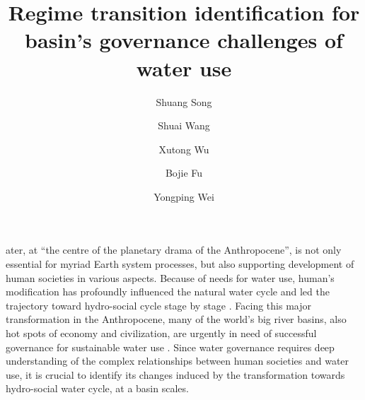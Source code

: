 \documentclass[9pt, twocolumn, twoside, lineno]{pnas-new}
\title{Regime transition identification for basin's governance challenges of water use}
\author[a, b]{Shuang Song}  %
\author[a, b, 1]{Shuai Wang}  %
\author[c, d]{Xutong Wu}  %
\author[a, b]{Bojie Fu}  %
\author[e]{Yongping Wei} %
\affil[a]{ %
	State Key Laboratory of Earth Surface Processes and Resource Ecology, 
	Faculty of Geographical Science, 
	Beijing Normal University, 
	Beijing 100875, 
	P.R. China
}
\affil[b]{ %
	Institute of Land Surface System and Sustainability, 
	Faculty of Geographical Science, 
	Beijing Normal University, 
	Beijing 100875, 
	P.R. China
}
\affil[c]{ %
	College of Urban and Environmental Sciences, 
	Peking University, 
	Beijing 100871, 
	P.R. China
}
\affil[d]{ %
	State Key Laboratory of Urban and Regional Ecology, 
	Research Center for Eco-Environmental Sciences, 
	Chinese Academy of Sciences, 
	Beijing 100085, 
	P.R. China 
}
\affil[e]{ %
	School of Earth and Environmental Sciences, 
	The University of Queensland, 
	Brisbane 4067, 
	Australia
}
\begin{document}
\maketitle
\thispagestyle{firststyle}

\label{introduction-section-1}
ater, at “the centre of the planetary drama of the Anthropocene”, is not only essential for myriad Earth system processes, but also supporting development of human societies in various aspects. 
Because of needs for water use, human's modification has profoundly influenced the natural water cycle and led the trajectory toward hydro-social cycle stage by stage
\cite{gleesonIlluminatingWaterCycle2020,cummingLinkingEconomicGrowth2018}.
Facing this major transformation in the Anthropocene, many of the world's big river basins, also hot spots of economy and civilization, are urgently in need of successful governance for sustainable water use
\cite{bestAnthropogenicStressesWorld2019}. 
Since water governance requires deep understanding of the complex relationships between human societies and water use, it is crucial to identify its changes induced by the transformation towards hydro-social water cycle, at a basin scales.
\end{document}
